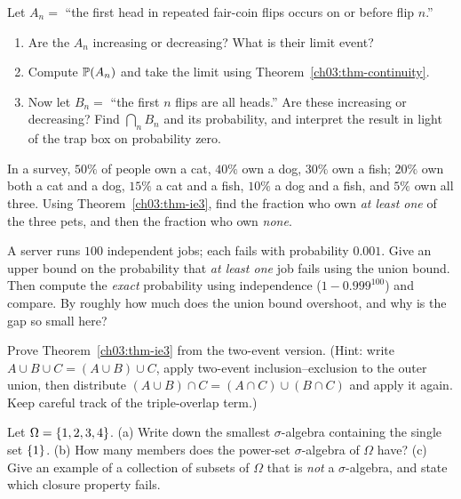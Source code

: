 \begin{exercise}
\label{ch03:exr-continuity}
Let $A_n = $ ``the first head in repeated fair-coin flips occurs on or before
flip $n$.''
\begin{enumerate}[label=(\alph*)]
\item Are the $A_n$ increasing or decreasing? What is their limit event?
\item Compute $\P(A_n)$ and take the limit using
Theorem~\ref{ch03:thm-continuity}.
\item Now let $B_n = $ ``the first $n$ flips are all heads.'' Are these
increasing or decreasing? Find $\bigcap_n B_n$ and its probability, and interpret
the result in light of the trap box on probability zero.
\end{enumerate}
\end{exercise}

\begin{exercise}
\label{ch03:exr-ie3}
In a survey, $50\%$ of people own a cat, $40\%$ own a dog, $30\%$ own a fish;
$20\%$ own both a cat and a dog, $15\%$ a cat and a fish, $10\%$ a dog and a fish,
and $5\%$ own all three. Using Theorem~\ref{ch03:thm-ie3}, find the fraction who
own \emph{at least one} of the three pets, and then the fraction who own
\emph{none}.
\end{exercise}

\begin{exercise}
\label{ch03:exr-union-bound}
A server runs $100$ independent jobs; each fails with probability $0.001$. Give
an upper bound on the probability that \emph{at least one} job fails using the
union bound. Then compute the \emph{exact} probability using independence
($1 - 0.999^{100}$) and compare. By roughly how much does the union bound
overshoot, and why is the gap so small here?
\end{exercise}

\begin{exercise}
\label{ch03:exr-prove-ie3}
Prove Theorem~\ref{ch03:thm-ie3} from the two-event version. (Hint: write
$A \cup B \cup C = (A \cup B) \cup C$, apply two-event inclusion--exclusion to the
outer union, then distribute $(A\cup B)\cap C = (A\cap C)\cup(B\cap C)$ and apply
it again. Keep careful track of the triple-overlap term.)
\end{exercise}

\begin{exercise}
\label{ch03:exr-sigma}
Let $\Omega = \set{1,2,3,4}$. (a) Write down the smallest $\sigma$-algebra
containing the single set $\set{1}$. (b) How many members does the power-set
$\sigma$-algebra of $\Omega$ have? (c) Give an example of a collection of subsets
of $\Omega$ that is \emph{not} a $\sigma$-algebra, and state which closure
property fails.
\end{exercise}

